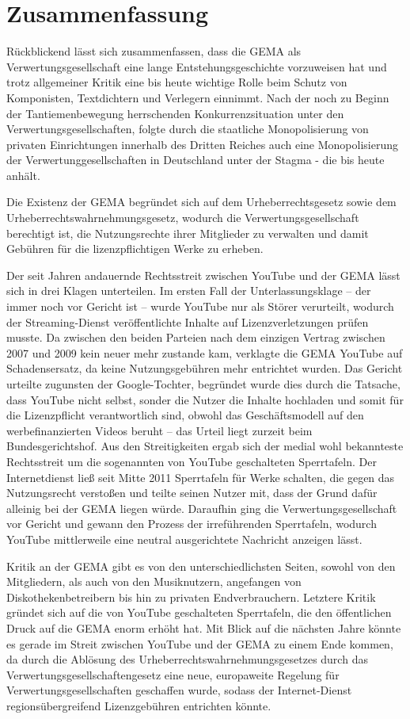 \chapter{Zusammenfassung}
Rückblickend lässt sich zusammenfassen, dass die GEMA als Verwertungsgesellschaft eine lange Entstehungsgeschichte vorzuweisen hat und trotz allgemeiner Kritik eine bis heute wichtige Rolle beim Schutz von Komponisten, Textdichtern und Verlegern einnimmt. Nach der noch zu Beginn der Tantiemenbewegung herrschenden Konkurrenzsituation unter den Verwertungsgesellschaften, folgte durch die staatliche Monopolisierung von privaten Einrichtungen innerhalb des Dritten Reiches auch eine Monopolisierung der Verwertunggesellschaften in Deutschland unter der Stagma - die bis heute anhält.

Die Existenz der GEMA begründet sich auf dem Urheberrechtsgesetz sowie dem Urheberrechtswahrnehmungsgesetz, wodurch die Verwertungsgesellschaft berechtigt ist, die Nutzungsrechte ihrer Mitglieder zu verwalten und damit Gebühren für die lizenzpflichtigen Werke zu erheben. 

Der seit Jahren andauernde Rechtsstreit zwischen YouTube und der GEMA lässt sich in drei Klagen unterteilen. Im ersten Fall der Unterlassungsklage -- der immer noch vor Gericht ist -- wurde YouTube nur als Störer verurteilt, wodurch der Streaming-Dienst veröffentlichte Inhalte auf Lizenzverletzungen prüfen musste. Da zwischen den beiden Parteien nach dem einzigen Vertrag zwischen 2007 und 2009 kein neuer mehr zustande kam, verklagte die GEMA YouTube auf Schadensersatz, da keine Nutzungsgebühren mehr entrichtet wurden. Das Gericht urteilte zugunsten der Google-Tochter, begründet wurde dies durch die Tatsache, dass YouTube nicht selbst, sonder die Nutzer die Inhalte hochladen und somit für die Lizenzpflicht verantwortlich sind, obwohl das Geschäftsmodell auf den werbefinanzierten Videos beruht -- das Urteil liegt zurzeit beim Bundesgerichtshof. Aus den Streitigkeiten ergab sich der medial wohl bekannteste Rechtsstreit um die sogenannten von YouTube geschalteten Sperrtafeln. Der Internetdienst ließ seit Mitte 2011 Sperrtafeln für Werke schalten, die gegen das Nutzungsrecht verstoßen und teilte seinen Nutzer mit, dass der Grund dafür alleinig bei der GEMA liegen würde. Daraufhin ging die Verwertungsgesellschaft vor Gericht und gewann den Prozess der irreführenden Sperrtafeln, wodurch YouTube mittlerweile eine neutral ausgerichtete Nachricht anzeigen lässt. 

Kritik an der GEMA gibt es von den unterschiedlichsten Seiten, sowohl von den Mitgliedern, als auch von den Musiknutzern, angefangen von Diskothekenbetreibern bis hin zu privaten Endverbrauchern. Letztere Kritik gründet sich auf die von YouTube geschalteten Sperrtafeln, die den öffentlichen Druck auf die GEMA enorm erhöht hat.
\newpage
Mit Blick auf die nächsten Jahre könnte es gerade im Streit zwischen YouTube und der GEMA zu einem Ende kommen, da durch die Ablösung des Urheberrechtswahrnehmungsgesetzes durch das Verwertungsgesellschaftengesetz eine neue, europaweite Regelung für Verwertungsgesellschaften geschaffen wurde, sodass der Internet-Dienst regionsübergreifend Lizenzgebühren entrichten könnte.